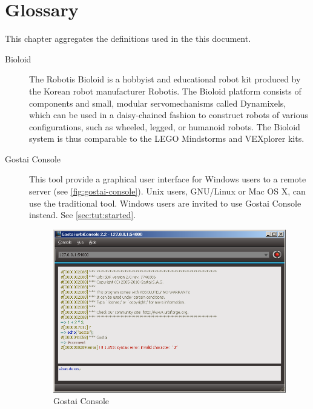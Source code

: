 
\chapter{Glossary}
\label{sec:glossary}

This chapter aggregates the definitions used in the this document.

\begin{description}
\item[Bioloid] The Robotis Bioloid is a hobbyist and educational robot kit
  produced by the Korean robot manufacturer Robotis. The Bioloid platform
  consists of components and small, modular servomechanisms called
  Dynamixels, which can be used in a daisy-chained fashion to construct
  robots of various configurations, such as wheeled, legged, or humanoid
  robots. The Bioloid system is thus comparable to the LEGO Mindstorms and
  VEXplorer kits.

\item[Gostai Console] This tool provide a graphical user interface for
  Windows users to a remote \urbi server (see
  \autoref{fig:gostai-console}).  Unix users, GNU/Linux or Mac OS X,
  can use the traditional  tool.  Windows users are
  invited to use Gostai Console instead.  See
  \autoref{sec:tut:started}.

  \begin{figure}[htp]
    \centering
    \includegraphics[width=.8\linewidth]{img/urbi-console}
    \caption{Gostai Console}
    \label{fig:gostai-console}
  \end{figure}



\end{description}
